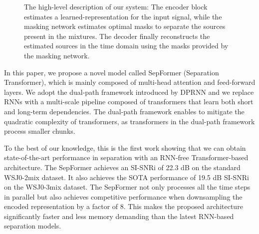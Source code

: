 \documentclass{article}
\begin{document}
\begin{figure}[t!]
\centering
\caption{The high-level description of our system: The encoder block estimates a learned-representation for the input signal, while the masking network estimates optimal masks to separate the sources present in the mixtures. The decoder finally reconstructs the estimated sources in the time domain using the masks provided by the masking network. }
\label{fig:tasnetpipeline}
\end{figure}


In this paper, we propose a novel model called SepFormer (Separation Transformer), which is mainly composed of multi-head attention and feed-forward layers. We adopt the dual-path framework introduced by DPRNN and we replace RNNs with a multi-scale pipeline composed of transformers that learn both short and long-term dependencies. The dual-path framework enables to mitigate the quadratic complexity of transformers, as transformers in the dual-path framework process smaller chunks.  



To the best of our knowledge, this is the first work showing that we can obtain state-of-the-art performance in separation with an RNN-free Transformer-based architecture. The SepFormer achieves an SI-SNRi of 22.3 dB on the standard WSJ0-2mix dataset. It also achieves the SOTA performance of 19.5 dB SI-SNRi on the WSJ0-3mix dataset. The SepFormer not only processes all the time steps in parallel but also achieves competitive performance when downsampling the encoded representation by a factor of 8. This makes the proposed architecture significantly faster and less memory demanding than the latest RNN-based separation models.
\end{document}
